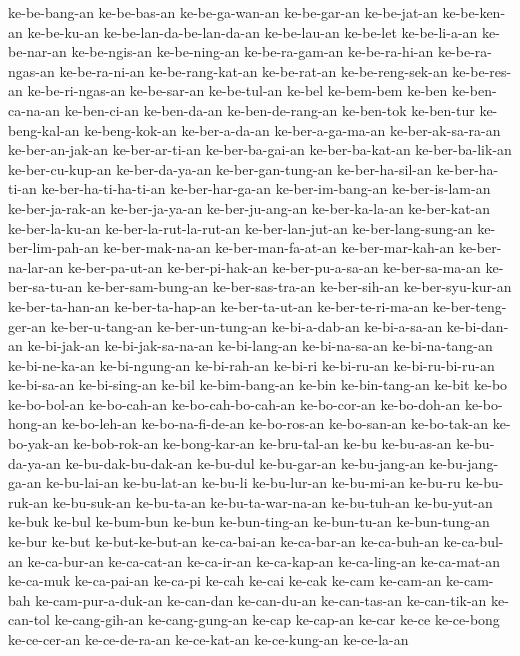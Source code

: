 {ke-be-bang-an ke-be-bas-an ke-be-ga-wan-an ke-be-gar-an ke-be-jat-an
ke-be-ken-an ke-be-ku-an ke-be-lan-da-be-lan-da-an ke-be-lau-an ke-be-let
ke-be-li-a-an ke-be-nar-an ke-be-ngis-an ke-be-ning-an ke-be-ra-gam-an
ke-be-ra-hi-an ke-be-ra-ngas-an ke-be-ra-ni-an ke-be-rang-kat-an
ke-be-rat-an ke-be-reng-sek-an ke-be-res-an ke-be-ri-ngas-an ke-be-sar-an
ke-be-tul-an ke-bel ke-bem-bem ke-ben ke-ben-ca-na-an ke-ben-ci-an
ke-ben-da-an ke-ben-de-rang-an ke-ben-tok ke-ben-tur ke-beng-kal-an
ke-beng-kok-an ke-ber-a-da-an ke-ber-a-ga-ma-an ke-ber-ak-sa-ra-an
ke-ber-an-jak-an ke-ber-ar-ti-an ke-ber-ba-gai-an ke-ber-ba-kat-an
ke-ber-ba-lik-an ke-ber-cu-kup-an ke-ber-da-ya-an ke-ber-gan-tung-an
ke-ber-ha-sil-an ke-ber-ha-ti-an ke-ber-ha-ti-ha-ti-an ke-ber-har-ga-an
ke-ber-im-bang-an ke-ber-is-lam-an ke-ber-ja-rak-an ke-ber-ja-ya-an
ke-ber-ju-ang-an ke-ber-ka-la-an ke-ber-kat-an ke-ber-la-ku-an
ke-ber-la-rut-la-rut-an ke-ber-lan-jut-an ke-ber-lang-sung-an
ke-ber-lim-pah-an ke-ber-mak-na-an ke-ber-man-fa-at-an ke-ber-mar-kah-an
ke-ber-na-lar-an ke-ber-pa-ut-an ke-ber-pi-hak-an ke-ber-pu-a-sa-an
ke-ber-sa-ma-an ke-ber-sa-tu-an ke-ber-sam-bung-an ke-ber-sas-tra-an
ke-ber-sih-an ke-ber-syu-kur-an ke-ber-ta-han-an ke-ber-ta-hap-an
ke-ber-ta-ut-an ke-ber-te-ri-ma-an ke-ber-teng-ger-an ke-ber-u-tang-an
ke-ber-un-tung-an ke-bi-a-dab-an ke-bi-a-sa-an ke-bi-dan-an ke-bi-jak-an
ke-bi-jak-sa-na-an ke-bi-lang-an ke-bi-na-sa-an ke-bi-na-tang-an
ke-bi-ne-ka-an ke-bi-ngung-an ke-bi-rah-an ke-bi-ri ke-bi-ru-an
ke-bi-ru-bi-ru-an ke-bi-sa-an ke-bi-sing-an ke-bil ke-bim-bang-an ke-bin
ke-bin-tang-an ke-bit ke-bo ke-bo-bol-an ke-bo-cah-an ke-bo-cah-bo-cah-an
ke-bo-cor-an ke-bo-doh-an ke-bo-hong-an ke-bo-leh-an ke-bo-na-fi-de-an
ke-bo-ros-an ke-bo-san-an ke-bo-tak-an ke-bo-yak-an ke-bob-rok-an
ke-bong-kar-an ke-bru-tal-an ke-bu ke-bu-as-an ke-bu-da-ya-an
ke-bu-dak-bu-dak-an ke-bu-dul ke-bu-gar-an ke-bu-jang-an ke-bu-jang-ga-an
ke-bu-lai-an ke-bu-lat-an ke-bu-li ke-bu-lur-an ke-bu-mi-an ke-bu-ru
ke-bu-ruk-an ke-bu-suk-an ke-bu-ta-an ke-bu-ta-war-na-an ke-bu-tuh-an
ke-bu-yut-an ke-buk ke-bul ke-bum-bun ke-bun ke-bun-ting-an ke-bun-tu-an
ke-bun-tung-an ke-bur ke-but ke-but-ke-but-an ke-ca-bai-an ke-ca-bar-an
ke-ca-buh-an ke-ca-bul-an ke-ca-bur-an ke-ca-cat-an ke-ca-ir-an
ke-ca-kap-an ke-ca-ling-an ke-ca-mat-an ke-ca-muk ke-ca-pai-an ke-ca-pi
ke-cah ke-cai ke-cak ke-cam ke-cam-an ke-cam-bah ke-cam-pur-a-duk-an
ke-can-dan ke-can-du-an ke-can-tas-an ke-can-tik-an ke-can-tol
ke-cang-gih-an ke-cang-gung-an ke-cap ke-cap-an ke-car ke-ce ke-ce-bong
ke-ce-cer-an ke-ce-de-ra-an ke-ce-kat-an ke-ce-kung-an ke-ce-la-an
}
